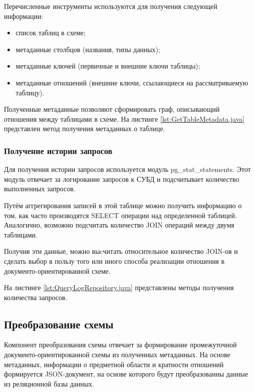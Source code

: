 Перечисленные инструменты используются для получения следующей информации:
\begin{itemize}[label=---]
    \item список таблиц в схеме;
    \item метаданные столбцов (названия, типы данных);
    \item метаданные ключей (первичные и внешние ключи таблицы);
    \item метаданные отношений (внешние ключи, ссылающиеся на рассматриваемую таблицу).
\end{itemize}

Полученные метаданные позволяют сформировать граф, описывающий отношения между таблицами в схеме.
На листинге \ref{lst:GetTableMetadata.java} представлен метод получения метаданных о таблице.

\clearpage


\clearpage

\subsubsection{Получение истории запросов}

Для получения истории запросов используется модуль \textmd{pg\_stat\_statements}. 
Этот модуль отвечает за логирование запросов к СУБД и подсчитывает количество выполненных запросов.

Путём аггрегирования записей в этой таблице можно получить информацию о том, 
как часто производятся \textmd{SELECT} операции над определенной таблицей.
Аналогично, возможно подсчитать количество \textmd{JOIN} операций между двумя таблицами.

Получив эти данные, можно выcчитать относительное количество JOIN-ов и 
сделать выбор в пользу того или иного способа реализации отношения в документо-ориентированной схеме.

На листинге \ref{lst:QueryLogRepository.java} представлены методы получения количества запросов.

\clearpage

\subsection{Преобразование схемы}

Компонент преобразования схемы отвечает за формирование промежуточной 
документо-ориентированной схемы из полученных метаданных. 
На основе метаданных, информации о предметной области и кратности отношений формируется JSON-документ,
на основе которого будут преобразованны данные из реляционной базы данных.

